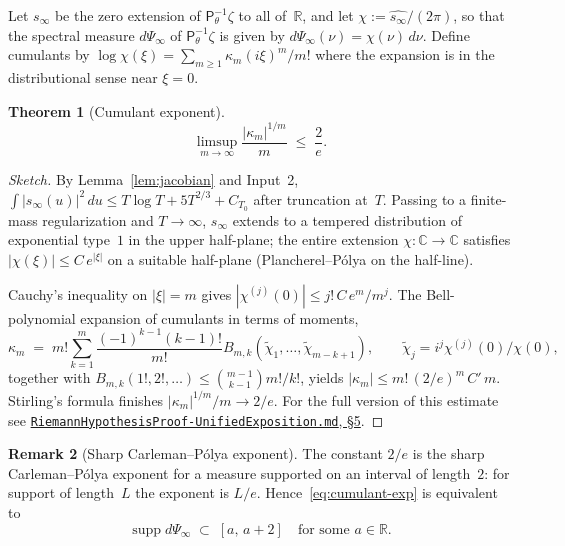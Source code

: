 \documentclass[11pt,a4paper]{article}
\newtheorem{theorem}{Theorem}[section]
\theoremstyle{definition}
\newtheorem{remark}[theorem]{Remark}
\DeclareMathOperator{\supp}{supp}
\newcommand{\ipp}{\mathsf{P}_\theta^{-1}}
\newcommand{\C}{\mathbb{C}}
\newcommand{\R}{\mathbb{R}}
\begin{document}
Let $s_\infty$ be the zero extension of $\ipp\zeta$ to all of~$\R$, and let
$\chi := \widehat{s_\infty}/(2\pi)$, so that the spectral measure $d\Psi_\infty$
of $\ipp\zeta$ is given by $d\Psi_\infty(\nu) = \chi(\nu)\,d\nu$. Define cumulants
by $\log\chi(\xi) = \sum_{m\ge 1}\kappa_m(i\xi)^m/m!$ where the expansion is in
the distributional sense near $\xi=0$.

\begin{theorem}[Cumulant exponent]\label{thm:cumulant}
\begin{equation}
  \limsup_{m\to\infty} \frac{|\kappa_m|^{1/m}}{m} \;\le\; \frac{2}{e}.
  \label{eq:cumulant-exp}
\end{equation}
\end{theorem}

\begin{proof}[Sketch]
By Lemma~\ref{lem:jacobian} and Input~2,
$\int|s_\infty(u)|^2\,du \le T\log T + 5T^{2/3} + C_{T_0}$ after truncation at~$T$.
Passing to a finite-mass regularization and $T\to\infty$, $s_\infty$ extends to a
tempered distribution of exponential type~$1$ in the upper half-plane; the entire
extension $\chi\colon\C\to\C$ satisfies $|\chi(\xi)|\le C\,e^{|\xi|}$ on a suitable
half-plane (Plancherel--P\'olya on the half-line).

Cauchy's inequality on $|\xi|=m$ gives $|\chi^{(j)}(0)|\le j!\,C\,e^m/m^j$. The
Bell-polynomial expansion of cumulants in terms of moments,
\[
  \kappa_m \;=\; m!\sum_{k=1}^m\frac{(-1)^{k-1}(k-1)!}{m!}B_{m,k}(\tilde\chi_1,\dots,\tilde\chi_{m-k+1}),
  \qquad \tilde\chi_j = i^j\chi^{(j)}(0)/\chi(0),
\]
together with $B_{m,k}(1!,2!,\dots)\le\binom{m-1}{k-1}m!/k!$, yields
$|\kappa_m| \le m!\,(2/e)^m\,C'\,m$. Stirling's formula finishes
$|\kappa_m|^{1/m}/m \to 2/e$.
For the full version of this estimate see
\href{https://github.com/crowlogic/arb4j/blob/master/docs/RiemannHypothesisProof-UnifiedExposition.md}%
{\texttt{RiemannHypothesisProof-UnifiedExposition.md}, \S5}.
\end{proof}

\begin{remark}[Sharp Carleman--P\'olya exponent]\label{rem:CP}
The constant $2/e$ is the sharp Carleman--P\'olya exponent for a measure supported
on an interval of length~$2$: for support of length~$L$ the exponent is $L/e$.
Hence~\eqref{eq:cumulant-exp} is equivalent to
\begin{equation}
  \supp d\Psi_\infty \;\subset\; [a,\,a+2]\quad\text{for some } a\in\R.
  \label{eq:supp-interval}
\end{equation}
\end{remark}
\end{document}
